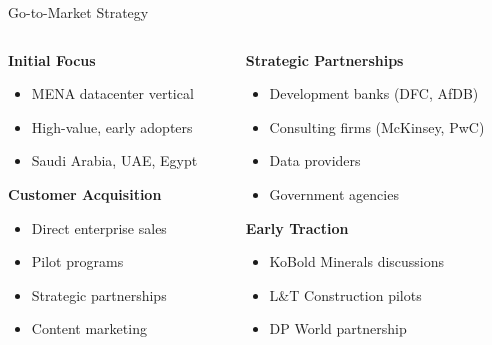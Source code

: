 \documentclass[aspectratio=169]{beamer}
\begin{document}
\begin{frame}{Go-to-Market Strategy}
    \begin{columns}
        \begin{column}{0.5\textwidth}
            \textbf{Initial Focus}
            \begin{itemize}
                \item MENA datacenter vertical
                \item High-value, early adopters
                \item Saudi Arabia, UAE, Egypt
            \end{itemize}
            
            \vspace{0.5cm}
            \textbf{Customer Acquisition}
            \begin{itemize}
                \item Direct enterprise sales
                \item Pilot programs
                \item Strategic partnerships
                \item Content marketing
            \end{itemize}
        \end{column}
        \begin{column}{0.5\textwidth}
            \textbf{Strategic Partnerships}
            \begin{itemize}
                \item Development banks (DFC, AfDB)
                \item Consulting firms (McKinsey, PwC)
                \item Data providers
                \item Government agencies
            \end{itemize}
            
            \vspace{0.5cm}
            \textbf{Early Traction}
            \begin{itemize}
                \item KoBold Minerals discussions
                \item L\&T Construction pilots
                \item DP World partnership
            \end{itemize}
        \end{column}
    \end{columns}
\end{frame}
\end{document}

